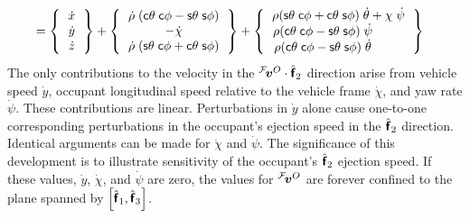 \documentclass[10pt,legalpaper,twocolumn,reqno]{amsart}
\begin{document}
\begin{eqnarray}
\label{eq:velocitySpecialCase}
\\
&= 
\left\{  
	\begin{tabular}{c}
 	  	$\dot{x}$ \\ 
 		$\dot{y}$ \\ 
 		$\dot{z}$
 	\end{tabular}
\right\}
+
\left\{  
	\begin{tabular}{c}
 	  	$\dot{\rho} \; (\hcos \theta \; \hcos \phi - \hsin \theta \; \hsin \phi)$ \\ 
 		$-\dot{\chi}$ \\ 
 		$\dot{\rho} \; (\hsin \theta \; \hcos \phi + \hcos \theta \; \hsin \phi)$
 	\end{tabular}
\right\}
+
\left\{  
	\begin{tabular}{c}
 	  	$\rho (\hsin \theta \; \hcos \phi + \hcos \theta \; \hsin \phi) \; 
			\dot{\theta} + \chi \; \dot{\psi}$ \\ 
 		$\rho (\hcos \theta \; \hcos \phi - \hsin \theta \; \hsin \phi) \; 
			\dot{\psi} \;\;\;\;\;\;\;\; \;$ \\ 
 		$\rho (\hcos \theta \; \hcos \phi - \hsin \theta \; \hsin \phi) \; 
			\dot{\theta} \;\;\;\;\;\;\;\; \;$
 	\end{tabular}
\right\}
\end{eqnarray}
The only contributions to the velocity 
in the ${}^{\mathcal{F}}\!\mbox{\boldmath $v$}^{O} \cdot \hat{\mbox{\boldmath $\sf{f}$}}_2$ direction 
arise from vehicle speed $\dot{y}$,
occupant longitudinal speed relative to the vehicle frame $\dot{\chi}$,
and yaw rate $\dot{\psi}$.
These contributions are linear. 
Perturbations in
$\dot{y}$ alone cause one-to-one corresponding perturbations in the 
occupant's ejection speed in the $\hat{\mbox{\boldmath $\sf{f}$}}_2$ direction.  Identical arguments
can be made for $\dot{\chi}$ and $\dot{\psi}$.  
The significance of this development is to 
illustrate sensitivity of the occupant's $\hat{\mbox{\boldmath $\sf{f}$}}_2$ ejection speed.
If these values, $\dot{y}$, $\dot{\chi}$, and $\dot{\psi}$ are zero, the values for 
${}^{\mathcal{F}}\!\mbox{\boldmath $v$}^{O}$ are forever confined to the plane spanned by 
$\left[ \hat{\mbox{\boldmath $\sf{f}$}}_1, \hat{\mbox{\boldmath $\sf{f}$}}_3 \right]$.
\end{document}
